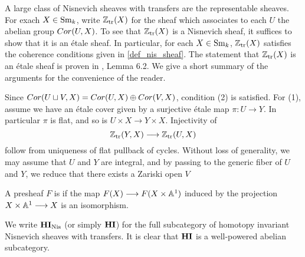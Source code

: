\begin{ex}
A large class of Nisnevich sheaves with transfers are the 
representable sheaves. For exach $X \in \mathrm{Sm}_{k}$, write $\mathbb{Z}_{\mathrm{tr}}(X)$
for the sheaf which associates to each $U$ the abelian group
$Cor(U, X)$. To see that $\mathbb{Z}_{\mathrm{tr}}(X)$ is a Nisnevich sheaf, it
suffices to show that it is an \'etale sheaf. In particular,
for each $X \in \mathrm{Sm}_{k}$, $\mathbb{Z}_{\mathrm{tr}}(X)$ satisfies the coherence 
conditions given in \ref{def_nis_sheaf}. The statement that
$\mathbb{Z}_{\mathrm{tr}}(X)$ is an \'etale sheaf is proven in \cite{MVW}, Lemma 6.2.
We give a short summary of the arguments for the convenience of
the reader.

Since $Cor(U \sqcup V, X) = Cor(U, X) \oplus Cor(V, X)$, condition 
(2) is satisfied. For (1), assume we have an \'etale cover given
by a surjective \'etale map $\pi: U \to Y$. In particular $\pi$ is
flat, and so is $U \times X \to Y \times X$. Injectivity of
\[
\mathbb{Z}_{\mathrm{tr}}(Y, X) \longrightarrow \mathbb{Z}_{\mathrm{tr}}(U, X)
\]
follow from uniqueness of flat pullback of cycles. Without loss
of generality, we may assume that $U$ and $Y$ are integral, and
by passing to the generic fiber of $U$ and $Y$, we reduce
that there exists a Zariski open $V$
\end{ex}

\begin{defn}
A presheaf $F$ is  if the map $F(X) \longrightarrow 
F(X \times \mathbb{A}^1)$ induced by the projection $X \times \mathbb{A}^1 \longrightarrow X$ 
is an isomorphism.

We write $\mathbf{HI}_{\mathrm{Nis}}$ (or simply $\mathbf{HI}$) for the full subcategory of 
homotopy invariant Nisnevich sheaves with transfers. It is clear
that $\mathbf{HI}$ is a well-powered abelian subcategory.
\end{defn}
